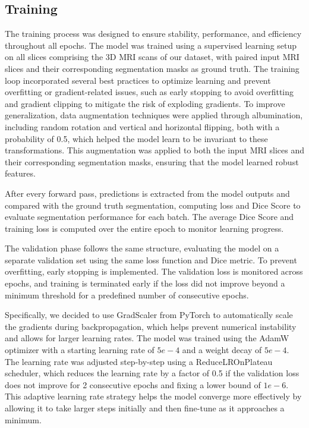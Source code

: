 \documentclass[10pt,twocolumn,letterpaper]{article}
\begin{document}
\subsection{Training}
The training process was designed to ensure stability, performance, and efficiency throughout all epochs. The model was trained using a supervised learning setup on all slices comprising the 3D MRI scans of our dataset, with paired input MRI slices and their corresponding segmentation masks as ground truth. The training loop incorporated several best practices to optimize learning and prevent overfitting or gradient-related issues, such as early stopping to avoid overfitting and gradient clipping to mitigate the risk of exploding gradients. To improve generalization, data augmentation techniques were applied through albumination, including random rotation and vertical and horizontal flipping, both with a probability of 0.5, which helped the model learn to be invariant to these transformations. This augmentation was applied to both the input MRI slices and their corresponding segmentation masks, ensuring that the model learned robust features.

After every forward pass, predictions is extracted from the model outputs and compared with the ground truth segmentation, computing loss and Dice Score to evaluate segmentation performance for each batch. The average Dice Score and training loss is computed over the entire epoch to monitor learning progress.

The validation phase follows the same structure, evaluating the model on a separate validation set using the same loss function and Dice metric.
To prevent overfitting, early stopping is implemented. The validation loss is monitored across epochs, and training is terminated early if the loss did not improve beyond a minimum threshold for a predefined number of consecutive epochs.

Specifically, we decided to use GradScaler from PyTorch to automatically scale the gradients during backpropagation, which helps prevent numerical instability and allows for larger learning rates. The model was trained using the AdamW optimizer with a starting learning rate of $5e-4$ and a weight decay of $5e-4$. The learning rate was adjusted step-by-step using a ReduceLROnPlateau scheduler, which reduces the learning rate by a factor of 0.5 if the validation loss does not improve for 2 consecutive epochs and fixing a lower bound of $1e-6$. This adaptive learning rate strategy helps the model converge more effectively by allowing it to take larger steps initially and then fine-tune as it approaches a minimum.
\end{document}
